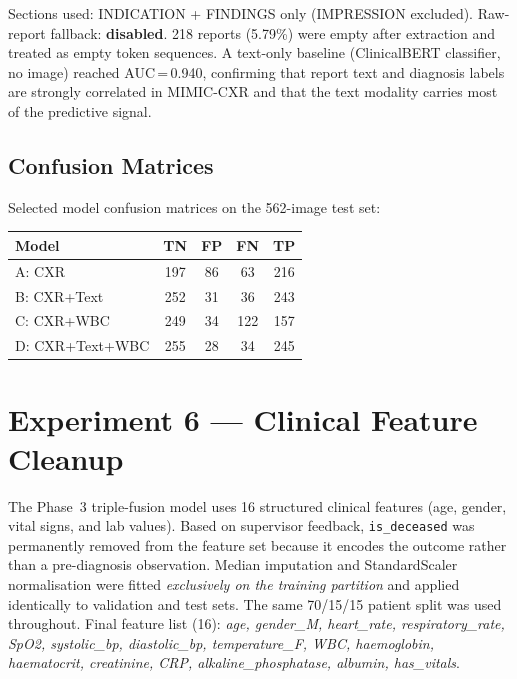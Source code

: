 \documentclass{article}
\begin{document}
Sections used: INDICATION + FINDINGS only (IMPRESSION excluded).
Raw-report fallback: \textbf{disabled}.
218 reports (5.79\%) were empty after extraction and treated as empty
token sequences.
A text-only baseline (ClinicalBERT classifier, no image) reached
AUC\,=\,0.940, confirming that report text and diagnosis labels are
strongly correlated in MIMIC-CXR and that the text modality carries
most of the predictive signal.

\subsection{Confusion Matrices}

Selected model confusion matrices on the 562-image test set:

\begin{center}
\small
\setlength{\tabcolsep}{5pt}
\begin{tabular}{lcccc}
\toprule
Model & TN & FP & FN & TP \\
\midrule
A: CXR            & 197 &  86 &  63 & 216 \\
B: CXR+Text       & 252 &  31 &  36 & 243 \\
C: CXR+WBC        & 249 &  34 & 122 & 157 \\
D: CXR+Text+WBC   & 255 &  28 &  34 & 245 \\
\bottomrule
\end{tabular}
\end{center}

\section{Experiment 6 — Clinical Feature Cleanup}

The Phase~3 triple-fusion model uses 16 structured clinical features
(age, gender, vital signs, and lab values).
Based on supervisor feedback, \texttt{is\_deceased} was permanently removed
from the feature set because it encodes the outcome rather than a
pre-diagnosis observation.
Median imputation and StandardScaler normalisation were fitted
\emph{exclusively on the training partition} and applied identically to
validation and test sets.
The same 70/15/15 patient split was used throughout.
Final feature list (16): \textit{age, gender\_M, heart\_rate,
respiratory\_rate, SpO2, systolic\_bp, diastolic\_bp, temperature\_F,
WBC, haemoglobin, haematocrit, creatinine, CRP, alkaline\_phosphatase,
albumin, has\_vitals}.
\end{document}
